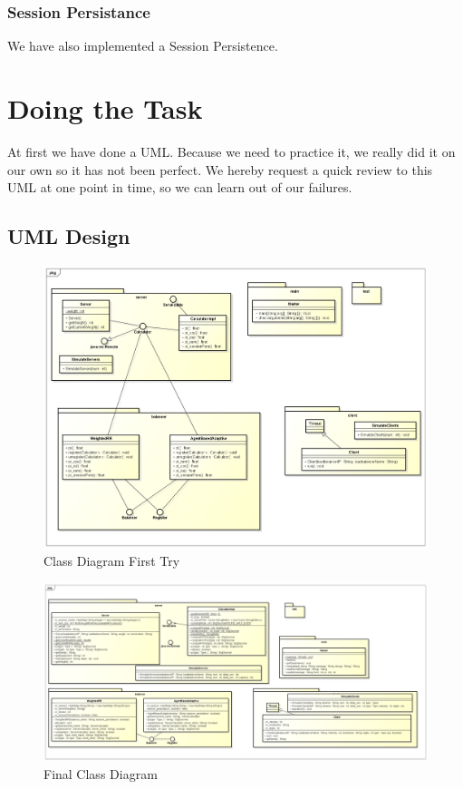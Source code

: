 \documentclass[12pt]{article}
\begin{document}
\subsubsection{Session Persistance}
We have also implemented a Session Persistence. 
\newpage
\section{Doing the Task}
At first we have done a UML. Because we need to practice it, we really did it on our own so it has not been perfect. We hereby request a quick review to this UML at one point in time, so we can learn out of our failures.
\subsection{UML Design}
\begin{figure}[here!]
\centering
    \includegraphics[width=1.0\textwidth]{images/cd1}
    \caption{Class Diagram First Try}
    \label{fig:cpu1}
\end{figure}
\begin{figure}[here!]
\centering
    \includegraphics[width=1.0\textwidth]{images/cd2}
    \caption{Final Class Diagram}
    \label{fig:cpu1}
\end{figure}
\FloatBarrier
\end{document}
